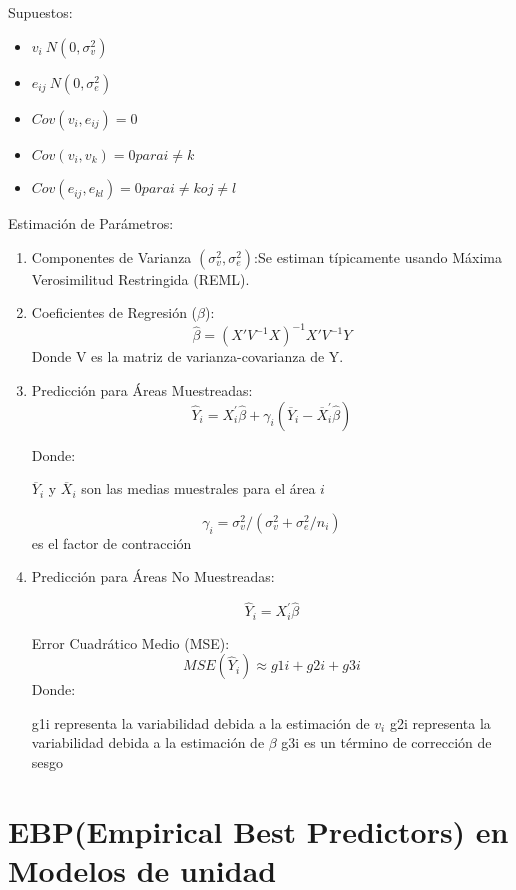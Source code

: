 \documentclass[12pt,spanish]{article}
\begin{document}
Supuestos:

\begin{itemize}
    \item $v_i ~ N(0, \sigma_v^2)$
    \item $e_{ij} ~ N(0, \sigma_e^2)$
    \item $Cov(v_i, e_{ij}) = 0$
    \item $Cov(v_i, v_k) = 0 para i \neq k$
    \item $Cov(e_{ij}, e_{kl}) = 0 para i \neq k o j \neq l$
\end{itemize}

Estimación de Parámetros:
\begin{enumerate}
    \item Componentes de Varianza $(\sigma_{v}^2,\sigma_{e}^2)$:Se estiman típicamente usando Máxima Verosimilitud Restringida (REML).
    \item Coeficientes de Regresión ($\beta$):
\[
\hat{\beta} = (X'V^{-1}X)^{-1} X'V^{-1}Y
\]
Donde V es la matriz de varianza-covarianza de Y.
\item Predicción para Áreas Muestreadas:
\[
\hat{Y}_{i} = X_{i}^{'} \hat{\beta} + \gamma_i(\overline{Y}_{i} - \overline{X}_{i}^{'} \hat{\beta})
\]

Donde:

$\overline{Y}_i$ y $\overline{X}_i$ son las medias muestrales para el área $i$

$$\gamma_i = \sigma_{v}^2 /  (\sigma_{v}^{2} + \sigma_{e}^{2}/n_i) $$es el factor de contracción


\item Predicción para Áreas No Muestreadas:

$$\hat{Y}_{i} = X_{i}^{'} \hat{\beta}$$

Error Cuadrático Medio (MSE):
\[
MSE(\hat{Y}_i) \approx g1i + g2i + g3i
\]
Donde:

g1i representa la variabilidad debida a la estimación de $v_i$
g2i representa la variabilidad debida a la estimación de $\beta$
g3i es un término de corrección de sesgo

\end{enumerate}


\section*{EBP(Empirical Best Predictors) en Modelos de unidad}
\end{document}
